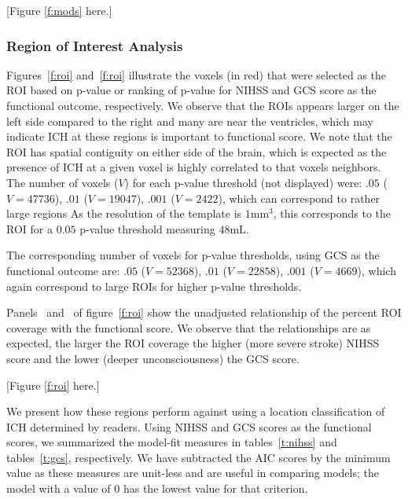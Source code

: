 \documentclass[10pt]{article}\usepackage[]{graphicx}\usepackage[]{color}
\begin{document}
[Figure \ref{f:mods} here.]

\subsubsection*{Region of Interest Analysis}





Figures~\ref{f:roi}\protect{} and~\ref{f:roi}\protect{} illustrate the voxels (in red) that were selected as the ROI based on p-value or ranking of p-value for NIHSS and GCS score as the functional outcome, respectively.  We observe that the ROIs appears larger on the left side compared to the right and many are near the ventricles, which may indicate ICH at these regions is important to functional score.  We note that the ROI has spatial contiguity on either side of the brain, which is expected as the presence of ICH at a given voxel is highly correlated to that voxels neighbors.  
The number of voxels ($V$) for each p-value threshold (not displayed) were: $.05$ ($V = 47736$), $.01$ ($V = 19047$), $.001$ ($V = 2422$), which can correspond to rather large regions  As the resolution of the template is $1$mm$^3$, this corresponds to the ROI for a $0.05$ p-value threshold measuring $48$mL. 




The corresponding number of voxels for p-value thresholds, using GCS as the functional outcome are:  $.05$ ($V = 52368$), $.01$ ($V = 22858$), $.001$ ($V = 4669$), which again correspond to large ROIs for higher p-value thresholds.

Panels~\protect{} and~\protect{} of figure~\ref{f:roi} show the unadjusted relationship of the percent ROI coverage with the functional score.  We observe that the relationships are as expected, the larger the ROI coverage the higher (more severe stroke) NIHSS score and the lower (deeper unconsciousness) the GCS score.

[Figure \ref{f:roi} here.]















We present how these regions perform against using a location classification of ICH determined by readers.  Using NIHSS and GCS scores as the functional scores, we summarized the model-fit measures in tables~\ref{t:nihss} and tables~\ref{t:gcs}, respectively.  We have subtracted the AIC scores by the minimum value as these measures are unit-less and are useful in comparing models; the model with a value of $0$ has the lowest value for that criterion.  
\end{document}
